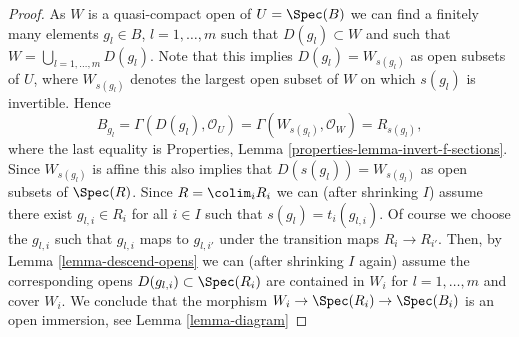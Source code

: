 \begin{proof}
\medskip\noindent
As $W$ is a quasi-compact open of $U = \Spec(B)$
we can find a finitely many elements $g_l \in B$, $l = 1, \ldots, m$
such that $D(g_l) \subset W$ and such that
$W = \bigcup_{l = 1, \ldots, m} D(g_l)$.
Note that this implies $D(g_l) = W_{s(g_l)}$ as open subsets of $U$,
where $W_{s(g_l)}$ denotes the largest open subset of $W$ on which
$s(g_l)$ is invertible. Hence
$$
B_{g_l} =
\Gamma(D(g_l), \mathcal{O}_U) =
\Gamma(W_{s(g_l)}, \mathcal{O}_W) = R_{s(g_l)},
$$
where the last equality is
Properties, Lemma \ref{properties-lemma-invert-f-sections}.
Since $W_{s(g_l)}$ is affine this also
implies that $D(s(g_l)) = W_{s(g_l)}$ as open subsets of $\Spec(R)$.
Since $R = \colim_i R_i$ we can (after shrinking $I$)
assume there exist $g_{l, i} \in R_i$ for all $i \in I$ such that
$s(g_l) = t_i(g_{l, i})$. Of course we choose the $g_{l, i}$
such that $g_{l, i}$ maps to $g_{l, i'}$ under the transition maps
$R_i \to R_{i'}$. Then, by Lemma \ref{lemma-descend-opens} we can
(after shrinking $I$ again)
assume the corresponding opens $D(g_{l, i}) \subset \Spec(R_i)$
are contained in $W_i$ for $l = 1, \ldots, m$ and cover $W_i$.
We conclude that the morphism $W_i \to \Spec(R_i) \to \Spec(B_i)$
is an open immersion, see Lemma \ref{lemma-diagram}


\end{proof}
